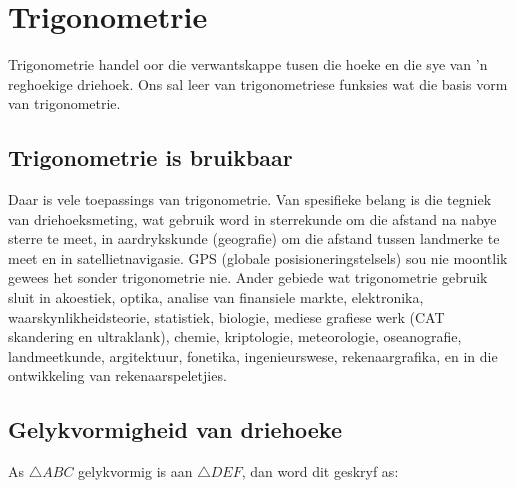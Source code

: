 \chapter{Trigonometrie}
\setcounter{figure}{1}
\setcounter{subfigure}{1}

Trigonometrie handel oor die verwantskappe tusen die hoeke en die sye van 'n reghoekige driehoek. Ons sal leer van trigonometriese funksies wat die basis vorm van trigonometrie.\par 

\section{Trigonometrie is bruikbaar}
\nopagebreak
Daar is vele toepassings van trigonometrie. Van spesifieke belang is die tegniek van driehoeksmeting, wat gebruik word in sterrekunde om die afstand na nabye sterre te meet, in aardrykskunde (geografie) om die afstand tussen landmerke te meet en in satellietnavigasie. GPS (globale posisioneringstelsels) sou nie moontlik gewees het sonder trigonometrie nie. Ander gebiede wat trigonometrie gebruik sluit in akoestiek, optika, analise van finansiele markte, elektronika, waarskynlikheidsteorie, statistiek, biologie, mediese grafiese werk (CAT skandering en ultraklank), chemie, kriptologie, meteorologie, oseanografie, landmeetkunde, argitektuur, fonetika, ingenieurswese, rekenaargrafika, en in die ontwikkeling van rekenaarspeletjies.\par 

%             

\section{Gelykvormigheid van driehoeke}

As $\triangle ABC$ gelykvormig is aan $ \triangle DEF$, dan word dit geskryf as:\par 

